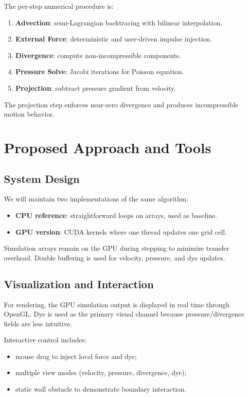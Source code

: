\documentclass[10pt,a4paper]{article}
\begin{document}
The per-step numerical procedure is:
\begin{enumerate}
    \item \textbf{Advection}: semi-Lagrangian backtracing with bilinear interpolation.
    \item \textbf{External Force}: deterministic and user-driven impulse injection.
    \item \textbf{Divergence}: compute non-incompressible components.
    \item \textbf{Pressure Solve}: Jacobi iterations for Poisson equation.
    \item \textbf{Projection}: subtract pressure gradient from velocity.
\end{enumerate}

The projection step enforces near-zero divergence and produces incompressible motion behavior.

\section{Proposed Approach and Tools}
\subsection{System Design}
We will maintain two implementations of the same algorithm:
\begin{itemize}
    \item \textbf{CPU reference}: straightforward loops on arrays, used as baseline.
    \item \textbf{GPU version}: CUDA kernels where one thread updates one grid cell.
\end{itemize}

Simulation arrays remain on the GPU during stepping to minimize transfer overhead. Double buffering is used for velocity, pressure, and dye updates.

\subsection{Visualization and Interaction}
For rendering, the GPU simulation output is displayed in real time through OpenGL. Dye is used as the primary visual channel because pressure/divergence fields are less intuitive.

Interactive control includes:
\begin{itemize}
    \item mouse drag to inject local force and dye;
    \item multiple view modes (velocity, pressure, divergence, dye);
    \item static wall obstacle to demonstrate boundary interaction.
\end{itemize}
\end{document}
